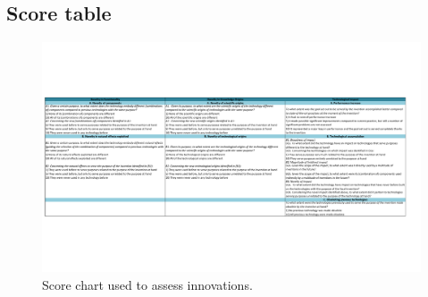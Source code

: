 \appendix
\tocless \chapter{}
\begin{landscape}
	\section{Score table}
		\begin{figure}[htp]
		\begin{center}
		  \includegraphics[width=\linewidth, trim=5 150 60 150]{img/score.pdf}
		  \caption{Score chart used to assess innovations.}
		  \label{fig:score}
		\end{center}
		\end{figure}
\end{landscape}